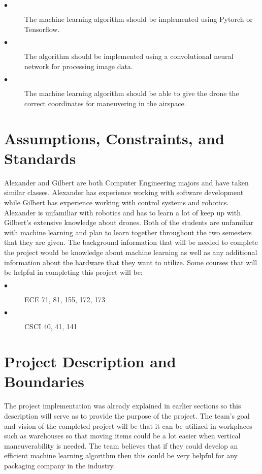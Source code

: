 \documentclass[12pt,onecolumn]{IEEEtran}			%
\begin{document}
 \begin{description}
  \item[$\bullet$ ] The machine learning algorithm should be implemented using Pytorch or Tensorflow. 
  \item[$\bullet$ ] The algorithm should be implemented using a convolutional neural network for processing image data. 
  \item[$\bullet$ ] The machine learning algorithm should be able to give the drone the correct coordinates for maneuvering in the airspace.
\end{description}
 
\section{Assumptions, Constraints, and Standards}
Alexander and Gilbert are both Computer Engineering majors and have taken similar classes. Alexander has experience working with software development while Gilbert has experience working with control systems and robotics. Alexander is unfamiliar with robotics and has to learn a lot of keep up with Gilbert's extensive knowledge about drones. Both of the students are unfamiliar with machine learning and plan to learn together throughout the two semesters that they are given. 
The background information that will be needed to complete the project would be knowledge about machine learning as well as any additional information about the hardware that they want to utilize. Some courses that will be helpful in completing this project will be: 

 \begin{description}
  \item[$\bullet$ ] ECE 71, 81, 155, 172, 173
  \item[$\bullet$ ] CSCI 40, 41, 141
\end{description}

 
\section{Project Description and Boundaries}

The project implementation was already explained in earlier sections so this description will serve as to provide the purpose of the project. The team's goal and vision of the completed project will be that it can be utilized in workplaces such as warehouses so that moving items could be a lot easier when vertical maneuverability is needed. The team believes that if they could develop an efficient machine learning algorithm then this could be very helpful for any packaging company in the industry. 
\end{document}
